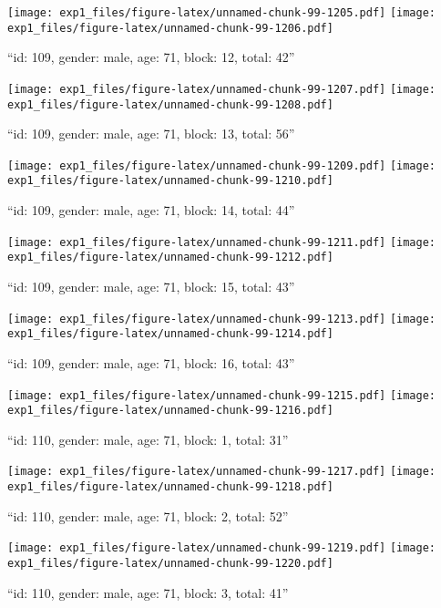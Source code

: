 \documentclass[,]{article}
\begin{document}
\texttt{[image: exp1\_files/figure-latex/unnamed-chunk-99-1205.pdf]}
\texttt{[image: exp1\_files/figure-latex/unnamed-chunk-99-1206.pdf]}

\newpage
[1] 

``id: 109, gender: male, age: 71, block: 12, total: 42''

\texttt{[image: exp1\_files/figure-latex/unnamed-chunk-99-1207.pdf]}
\texttt{[image: exp1\_files/figure-latex/unnamed-chunk-99-1208.pdf]}

\newpage
[1] 

``id: 109, gender: male, age: 71, block: 13, total: 56''

\texttt{[image: exp1\_files/figure-latex/unnamed-chunk-99-1209.pdf]}
\texttt{[image: exp1\_files/figure-latex/unnamed-chunk-99-1210.pdf]}

\newpage
[1] 

``id: 109, gender: male, age: 71, block: 14, total: 44''

\texttt{[image: exp1\_files/figure-latex/unnamed-chunk-99-1211.pdf]}
\texttt{[image: exp1\_files/figure-latex/unnamed-chunk-99-1212.pdf]}

\newpage
[1] 

``id: 109, gender: male, age: 71, block: 15, total: 43''

\texttt{[image: exp1\_files/figure-latex/unnamed-chunk-99-1213.pdf]}
\texttt{[image: exp1\_files/figure-latex/unnamed-chunk-99-1214.pdf]}

\newpage
[1] 

``id: 109, gender: male, age: 71, block: 16, total: 43''

\texttt{[image: exp1\_files/figure-latex/unnamed-chunk-99-1215.pdf]}
\texttt{[image: exp1\_files/figure-latex/unnamed-chunk-99-1216.pdf]}

\newpage
[1] 

``id: 110, gender: male, age: 71, block: 1, total: 31''

\texttt{[image: exp1\_files/figure-latex/unnamed-chunk-99-1217.pdf]}
\texttt{[image: exp1\_files/figure-latex/unnamed-chunk-99-1218.pdf]}

\newpage
[1] 

``id: 110, gender: male, age: 71, block: 2, total: 52''

\texttt{[image: exp1\_files/figure-latex/unnamed-chunk-99-1219.pdf]}
\texttt{[image: exp1\_files/figure-latex/unnamed-chunk-99-1220.pdf]}

\newpage
[1] 

``id: 110, gender: male, age: 71, block: 3, total: 41''
\end{document}
